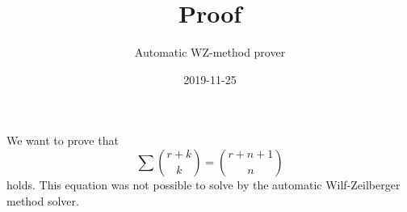 \documentclass{article}
\title{Proof}
\author{Automatic WZ-method prover}
\date{2019-11-25}
\begin{document}
\maketitle
We want to prove that
\begin{equation}\label{Eq: 1}
\sum \binom{r+k}{k} = \binom{r+n+1}{n}
\end{equation}
holds. This equation was not possible to solve by the automatic Wilf-Zeilberger method solver.
\end{document}
